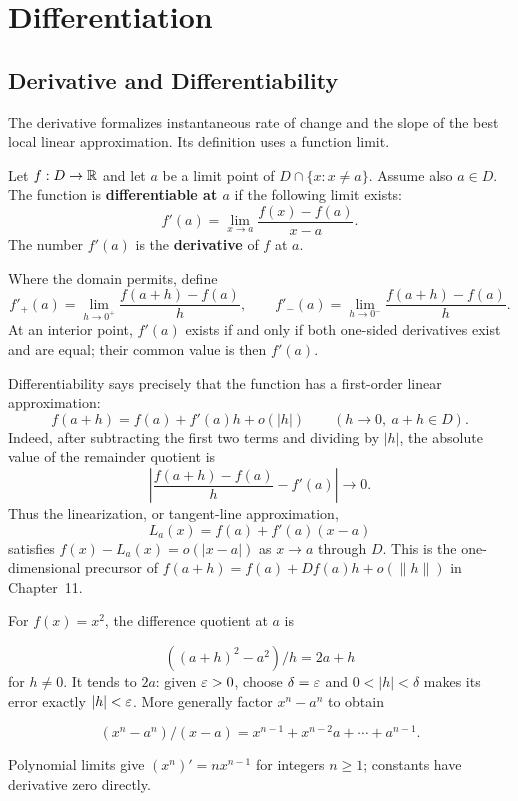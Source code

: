 \chapter{Differentiation}
\label{ch:differentiation}

\section{Derivative and Differentiability}

The derivative formalizes instantaneous rate of change and the slope of the
best local linear approximation. Its definition uses a function limit.

\begin{definition}[Derivative]
Let $f:D\to\mathbb{R}$ and let $a$ be a limit point of $D\cap\{x:x\ne a\}$. Assume also $a\in D$. The function is \textbf{differentiable at $a$} if the following limit exists:
\[
f'(a)=\lim_{x\to a}\frac{f(x)-f(a)}{x-a}.
\]
The number $f'(a)$ is the \textbf{derivative} of $f$ at $a$.
\end{definition}

\begin{definition}
\label{def:one-sided-derivatives}
Where the domain permits, define
\[
f'_+(a)=\lim_{h\to0^+}\frac{f(a+h)-f(a)}h,
\qquad
f'_-(a)=\lim_{h\to0^-}\frac{f(a+h)-f(a)}h.
\]
At an interior point, $f'(a)$ exists if and only if both one-sided
derivatives exist and are equal; their common value is then $f'(a)$.
\end{definition}

Differentiability says precisely that the function has a first-order linear
approximation:
\[
\boxed{f(a+h)=f(a)+f'(a)h+o(|h|)\qquad(h\to0,\ a+h\in D).}
\]
Indeed, after subtracting the first two terms and dividing by $|h|$, the
absolute value of the remainder quotient is
\[
\left|\frac{f(a+h)-f(a)}h-f'(a)\right|\longrightarrow0.
\]
Thus the linearization, or tangent-line approximation,
\[
L_a(x)=f(a)+f'(a)(x-a)
\]
satisfies $f(x)-L_a(x)=o(|x-a|)$ as $x\to a$ through $D$. This is the one-dimensional precursor of
$f(a+h)=f(a)+Df(a)h+o(\|h\|)$ in Chapter~11.

\begin{example}
For $f(x)=x^2$, the difference quotient at $a$ is

\[
((a+h)^2-a^2)/h=2a+h
\]
 for $h\ne0$.
It tends to $2a$: given $\varepsilon>0$, choose $\delta=\varepsilon$ and
$0<|h|<\delta$ makes its error exactly $|h|<\varepsilon$.
More generally factor $x^n-a^n$ to obtain

\[
(x^n-a^n)/(x-a)=x^{n-1}+x^{n-2}a+\cdots+a^{n-1}.
\]

Polynomial limits give $(x^n)'=nx^{n-1}$ for integers $n\geq1$;
constants have derivative zero directly.
\end{example}

